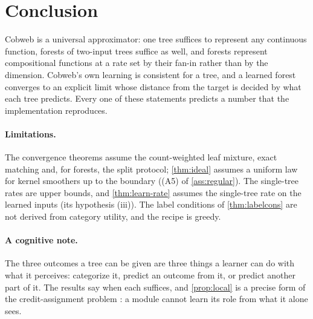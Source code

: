 \section{Conclusion}\label{sec:conclusion}

Cobweb is a universal approximator: one tree suffices to represent any continuous
function, forests of two-input trees suffice as well, and forests represent compositional
functions at a rate set by their fan-in rather than by the dimension.  Cobweb's own
learning is consistent for a tree, and a learned forest converges to an explicit limit
whose distance from the target is decided by what each tree predicts.  Every one of these
statements predicts a number that the implementation reproduces.

\paragraph{Limitations.}
The convergence theorems assume the count-weighted leaf mixture, exact matching and, for
forests, the split protocol; \cref{thm:ideal} assumes a uniform law for kernel smoothers up
to the boundary ((A5) of \cref{ass:regular}).  The single-tree rates are upper bounds, and \cref{thm:learn-rate} assumes the single-tree
rate on the learned inputs (its hypothesis (iii)).  The label conditions
of \cref{thm:labelcons} are not derived from category utility, and the recipe is greedy.

\paragraph{A cognitive note.}
The three outcomes a tree can be given are three things a learner can do with what it
perceives: categorize it, predict an outcome from it, or predict another part of it.  The
results say when each suffices, and \cref{prop:local} is a precise form of the
credit-assignment problem \citep{minsky1961}: a module cannot learn its role from what it
alone sees.

\appendix
{}
